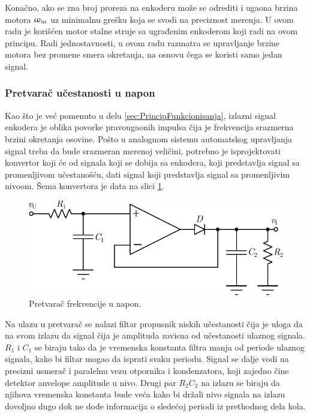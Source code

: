 \documentclass[a4paper, 12pt, diplomski]{etf}
\begin{document}
Konačno, ako se zna broj proreza na enkoderu može se odrediti i ugaona brzina motora $\upomega_{\rm m}$ uz minimalnu grešku koja se svodi na preciznost merenja. U ovom radu je korišćen motor stalne struje sa ugrađenim enkoderom koji radi na ovom principu. Radi jednostavnosti, u ovom radu razmatra se upravljanje brzine motora bez promene smera okretanja, na osnovu čega se koristi samo jedan signal.


\subsubsection{Pretvarač učestanosti u napon} \label{s:fv} \label{sec:fvKonvertor}

Kao što je već pomenuto u delu \ref{sec:PrincipFunkcionisanja}, izlazni signal enkodera je oblika povorke pravougaonih impulsa čija je frekvencija srazmerna brzini okretanja osovine. Pošto u analognom sistemu automatskog upravljanja signal treba da bude srazmeran merenoj veličini, potrebno je isprojektovati konvertor koji će od signala koji se dobija sa enkodera, koji predstavlja signal sa promenljivom učestanošću, dati signal koji predstavlja signal sa promenljivim nivoom. Šema konvertora je data na slici \ref{fvKonvertor}.

\break

\begin{figure}[h!]
    \centering
    \includegraphics[scale=1]{fig/fvKonvertor.pdf}
    \caption{Pretvarač frekvencije u napon.}
    \label{fvKonvertor}
\end{figure}

Na ulazu u pretvarač se nalazi filtar propusnik niskih učestanosti čija je uloga da na svom izlazu da signal čija je amplituda zavisna od učestanosti ulaznog signala. $R_1$ i $C_1$ se biraju tako da je vremenska konstanta filtra manja od periode ulaznog signala, kako bi filtar mogao da isprati svaku periodu. Signal se dalje vodi na precizni usmerač i paralelnu vezu otpornika i kondenzatora, koji zajedno čine detektor anvelope amplitude u nivo. Drugi par $R_2C_2$ na izlazu se biraju da njihova vremenska konstanta bude veća kako bi držali nivo signala na izlazu dovoljno dugo dok ne dođe informacija o sledećoj periodi iz prethodnog dela kola.
\end{document}
